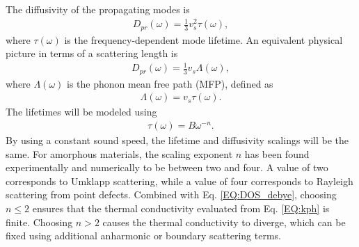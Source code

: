 \documentclass[aps,prb,onecolumn,preprint,superscriptaddress,footinbib,amsmath,amssymb,floatfix]{revtex4}
\begin{document}
The diffusivity of the propagating modes is    
\begin{equation}\label{EQ:Dtau}
\begin{split}
D_{pr}(\omega) = \frac{1}{3}v^2_s\tau(\omega),
\end{split}
\end{equation}
where $\tau(\omega)$ is the frequency-dependent mode 
lifetime.\cite{ziman_electrons_2001} An equivalent physical 
picture in terms of a scattering length is
\begin{equation}\label{EQ:DLambda}
\begin{split}
D_{pr}(\omega) = \frac{1}{3}v_s \Lambda(\omega),
\end{split}
\end{equation}
where $\Lambda(\omega)$ is the phonon mean free path (MFP), defined as 
\begin{equation}\label{EQ:Lambda}
\begin{split}
\Lambda(\omega) = v_{s} \tau(\omega).
\end{split}
\end{equation}
The lifetimes will be modeled using 
\begin{equation}\label{EQ:tauw2}
\begin{split}
\tau(\omega) = B \omega^{-n}.
\end{split}
\end{equation}
By using a constant sound speed, the lifetime and diffusivity 
scalings will be the same. 
For amorphous materials, the scaling exponent $n$ 
has been found experimentally and numerically to be 
between two and four.
\cite{
feldman_thermal_1993,morath_phonon_1996,benassi_evidence_1996,
feldman_numerical_1999,taraskin_determination_1999,
taraskin_propagation_2000,gotze_evolution_2000,ruocco_relaxation_2000,
ruocco_high-frequency_2001,horbach_high_2001,
matic_sound_2001,
feldman_calculations_2002,ruffle_observation_2003,
masciovecchio_evidence_2006,schirmacher_acoustic_2007,
christie_vibrational_2007,
shintani_universal_2008,xu_energy_2009,
liu_high_2009,ganter_rayleigh_2010,
vitelli_heat_2010,
baldi_sound_2010,yang_anomalously_2010,
wyart_scaling_2010,baldi_elastic_2011,
he_heat_2011,ayrinhac_subterahertz_2011,
baldi_emergence_2013}
A value of two corresponds to 
Umklapp scattering,\cite{callaway_model_1959} while a value of four 
corresponds to 
Rayleigh scattering from point defects.\cite{klemens_scattering_1955}
Combined with Eq. \eqref{EQ:DOS_debye}, choosing $n\le2$ ensures 
that the thermal conductivity evaluated from Eq. \eqref{EQ:kph} is finite. 
Choosing $n>2$ causes the thermal conductivity to diverge,   
which can be fixed using additional anharmonic
\cite{feldman_thermal_1993,feldman_numerical_1999} 
or boundary scattering terms.
\cite{cahill_thermal_1994,liu_high_2009,yang_anomalously_2010}
\end{document}
